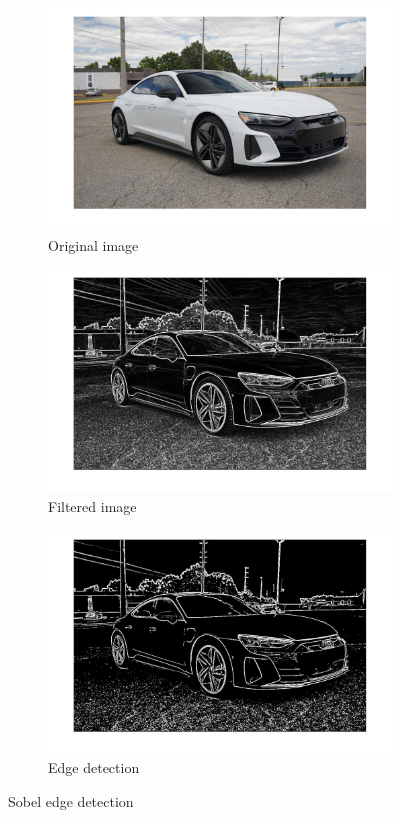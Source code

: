 \documentclass[conference]{IEEEtran}
\begin{document}
\begin{figure}[h!]
\centering
\begin{subfigure}[b]{0.3\linewidth}
\includegraphics[width=\linewidth]{images/original.jpg}
\caption{Original image}
\end{subfigure}
\begin{subfigure}[b]{0.3\linewidth}
\includegraphics[width=\linewidth]{images/img5.jpg}
\caption{Filtered image}
\end{subfigure}
\begin{subfigure}[b]{0.3\linewidth}
\includegraphics[width=\linewidth]{images/img6.jpg}
\caption{Edge detection}
\end{subfigure}
\caption{Sobel edge detection}
\label{fig:sobel edge}
\end{figure}
\end{document}
